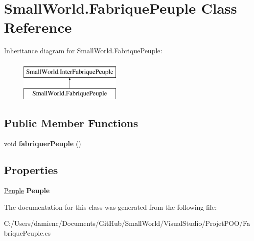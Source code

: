 \hypertarget{class_small_world_1_1_fabrique_peuple}{\section{Small\-World.\-Fabrique\-Peuple Class Reference}
\label{class_small_world_1_1_fabrique_peuple}
}
Inheritance diagram for Small\-World.\-Fabrique\-Peuple\-:\begin{figure}[H]
\begin{center}
\leavevmode
\includegraphics[height=2.000000cm]{class_small_world_1_1_fabrique_peuple}
\end{center}
\end{figure}
\subsection*{Public Member Functions}
\begin{DoxyCompactItemize}
\item 
\hypertarget{class_small_world_1_1_fabrique_peuple_a5e92ce7c8115c6f6c223bf908aaf066e}{void {\bfseries fabriquer\-Peuple} ()}\label{class_small_world_1_1_fabrique_peuple_a5e92ce7c8115c6f6c223bf908aaf066e}

\end{DoxyCompactItemize}
\subsection*{Properties}
\begin{DoxyCompactItemize}
\item 
\hypertarget{class_small_world_1_1_fabrique_peuple_a5bb438e8aefd913833f3ed53c3de577b}{\hyperlink{class_small_world_1_1_peuple}{Peuple} {\bfseries Peuple}}\label{class_small_world_1_1_fabrique_peuple_a5bb438e8aefd913833f3ed53c3de577b}

\end{DoxyCompactItemize}


The documentation for this class was generated from the following file\-:\begin{DoxyCompactItemize}
\item 
C\-:/\-Users/damienc/\-Documents/\-Git\-Hub/\-Small\-World/\-Visual\-Studio/\-Projet\-P\-O\-O/Fabrique\-Peuple.\-cs\end{DoxyCompactItemize}
